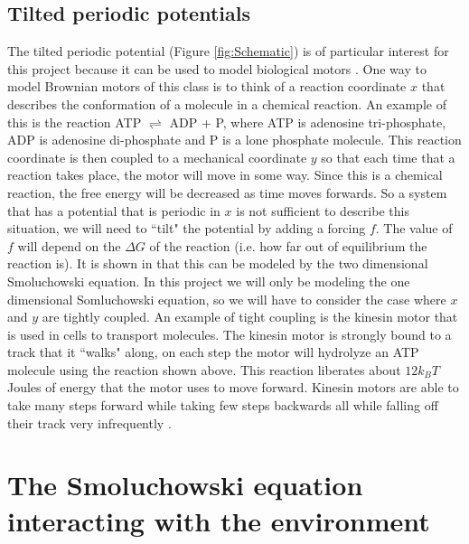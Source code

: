 \subsection{Tilted periodic potentials}
The tilted periodic potential (Figure \ref{fig:Schematic}) is of particular interest for this project because it can be used to model biological motors \cite{Leibler1993,Magnasco1994}. One way to model Brownian motors of this class is to think of a reaction coordinate $x$ that describes the conformation of a molecule in a chemical reaction. An example of this is the reaction ATP $\rightleftharpoons$ ADP + P, where ATP is adenosine tri-phosphate, ADP is adenosine di-phosphate and P is a lone phosphate molecule. This reaction coordinate is then coupled to a mechanical coordinate $y$ so that each time that a reaction takes place, the motor will move in some way. Since this is a chemical reaction, the free energy will be decreased as time moves forwards. So a system that has a potential that is periodic in $x$ is not sufficient to describe this situation, we will need to ``tilt" the potential by adding a forcing $f$. The value of $f$ will depend on the $\Delta G$ of the reaction (i.e. how far out of equilibrium the reaction is). It is shown in \cite{Magnasco1994} that this can be modeled by the two dimensional Smoluchowski equation. In this project we will only be modeling the one dimensional Somluchowski equation, so we will have to consider the case where $x$ and $y$ are tightly coupled. An example of tight coupling is the kinesin motor \cite{Leibler1993} that is used in cells to transport molecules. The kinesin motor is strongly bound to a track that it ``walks" along, on each step the motor will hydrolyze an ATP molecule using the reaction shown above. This reaction liberates about $12 k_B T$ Joules of energy that the motor uses to move forward. Kinesin motors are able to take many steps forward while taking few steps backwards all while falling off their track very infrequently \cite{BlockSM1990}.

\section{The Smoluchowski equation interacting with the environment} \label{Smoluchowski}

